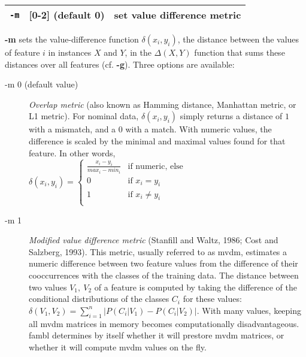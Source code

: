 \documentclass[11pt]{article}
\begin{document}
\begin{tabular}{|p{}|p{}|p{}|}
\hline
{\tt -m} & [0-2] (default 0) & set value difference metric \\
\hline
\end{tabular}

{\bf -m} sets the value-difference function $\delta(x_{i},y_{i})$, the
distance between the values of feature $i$ in instances $X$ and $Y$,
in the $\Delta(X,Y)$ function that sums these distances over all
features (cf. {\bf -g}). Three options are available:

\begin{description}

\item[-m 0 (default value)] {\em Overlap metric} (also known as
  Hamming distance, Manhattan metric, or L1 metric). For nominal data,
  $\delta(x_{i}, y_{i})$ simply returns a distance of $1$ with a
  mismatch, and a $0$ with a match. With numeric values, the
  difference is scaled by the minimal and maximal values found for
  that feature. In other words, \\
\begin{math}
\delta(x_{i}, y_{i}) = \left\{ \begin{array}{ll}
\frac{x_{i}-y_{i}}{max_{i}-min_{i}} & \mbox{if numeric, else}\\ 0 &
\mbox{if $x_{i} = y_{i}$}\\ 1 & \mbox{if $x_{i} \neq y_{i}$}\\
\end{array} \right.
\end{math}

\item[-m 1] {\em Modified value difference metric} (Stanfill and
  Waltz, 1986; Cost and Salzberg, 1993).  This metric, usually
  referred to as {\sc mvdm}, estimates a numeric difference between
  two feature values from the difference of their cooccurrences with
  the classes of the training data. The distance between two values
  $V_{1},\ V_{2}$ of a feature is computed by taking the difference of
  the conditional distributions of the classes $C_{i}$ for these
  values: $\delta(V_{1}, V_{2}) = \sum_{i=1}^{n} \left| P(C_{i}|V_{1})
  - P(C_{i}|V_{2}) \right|$. With many values, keeping all {\sc mvdm}
  matrices in memory becomes computationally disadvantageous. {\sc
    fambl} determines by itself whether it will prestore {\sc mvdm}
  matrices, or whether it will compute {\sc mvdm} values on the fly.


\end{description}
\end{document}
